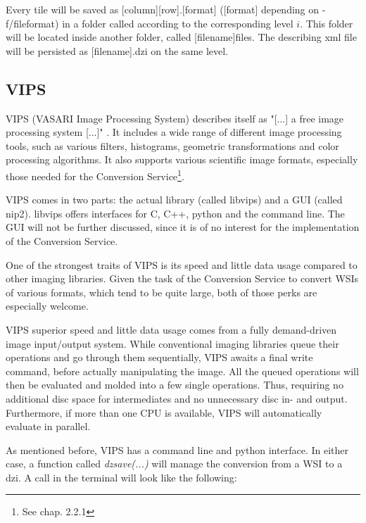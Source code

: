Every tile will be saved as [column]{\textunderscore}[row].[format] ([format] depending on -f/file{\textunderscore}format) in a folder called according to the corresponding level $i$. This folder will be located inside another folder, called [filename]{\textunderscore}files. The describing xml file will be persisted as [filename].dzi on the same level.


\subsection{VIPS}

VIPS (VASARI Image Processing System) describes itself as "[...] a free image processing system [...]" \cite{web:vips}. It includes a wide range of different image processing tools, such as various filters, histograms, geometric transformations and color processing algorithms. It also supports various scientific image formats, especially those needed for the Conversion Service\footnote{See chap. 2.2.1}\cite{web:vips}.

VIPS comes in two parts: the actual library (called libvips) and a GUI (called nip2). libvips offers interfaces for C, C++, python and the command line. The GUI will not be further discussed, since it is of no interest for the implementation of the Conversion Service.

One of the strongest traits of VIPS is its speed and little data usage compared to other imaging libraries\cite{cupitt05}. Given the task of the Conversion Service to convert WSIs of various formats, which tend to be quite large, both of those perks are especially welcome.

VIPS superior speed and little data usage comes from a fully demand-driven image input/output system. While conventional imaging libraries queue their operations and go through them sequentially, VIPS awaits a final write command, before actually manipulating the image. All the queued operations will then be evaluated and molded into a few single operations. Thus, requiring no additional disc space for intermediates and no unnecessary disc in- and output. Furthermore, if more than one CPU is available, VIPS will automatically evaluate in parallel\cite{cupitt96}.

As mentioned before, VIPS has a command line and python interface. In either case, a function called \emph{dzsave(...)} will manage the conversion from a WSI to a dzi. A call in the terminal will look like the following:

